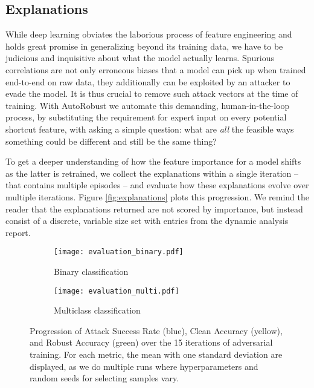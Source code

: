\subsection{Explanations}
While deep learning obviates the laborious process of feature engineering and holds great promise in generalizing beyond its training data, we have to be judicious and inquisitive about what the model actually learns.
Spurious correlations are not only erroneous biases that a model can pick up when trained end-to-end on raw data, they additionally can be exploited by an attacker to evade the model.
It is thus crucial to remove such attack vectors at the time of training.
With AutoRobust we automate this demanding, human-in-the-loop process, by substituting the requirement for expert input on every potential shortcut feature, with asking a simple question: what are \textit{all} the feasible ways something could be different and still be the same thing?

To get a deeper understanding of how the feature importance for a model shifts as the latter is retrained, we collect the explanations within a single iteration -- that contains multiple episodes -- and evaluate how these explanations evolve over multiple iterations.
Figure \ref{fig:explanations} plots this progression.
We remind the reader that the explanations returned are not scored by importance, but instead consist of a discrete, variable size set with entries from the dynamic analysis report.

\begin{figure}
    \centering
    \begin{subfigure}{0.49\columnwidth}
      \centering
      \texttt{[image: evaluation\_binary.pdf]}
      \caption{Binary classification}
    
    \end{subfigure}
    \begin{subfigure}{0.49\columnwidth}
      \centering
      \texttt{[image: evaluation\_multi.pdf]}
      \caption{Multiclass classification}
    
    \end{subfigure}
    \caption[Progression of ASR, Clean Accuracy, and Robust Accuracy over the 15 iterations of adversarial training.]{Progression of Attack Success Rate (blue), Clean Accuracy (yellow), and Robust Accuracy (green) over the 15 iterations of adversarial training. For each metric, the mean with one standard deviation are displayed, as we do multiple runs where hyperparameters and random seeds for selecting samples vary.}
    \label{fig:training}
\end{figure}

